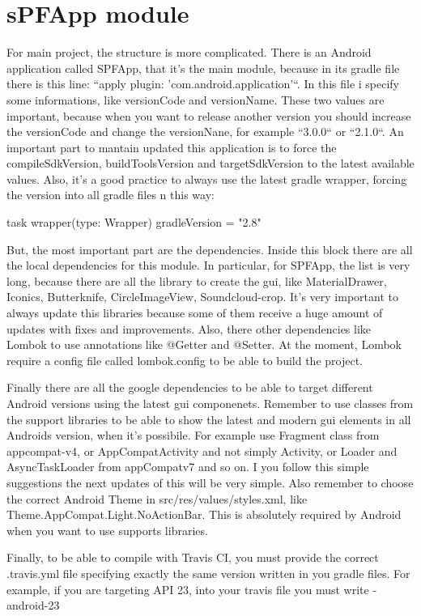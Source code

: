 \section*{sPFApp module}

For main project, the structure is more complicated.
There is an Android application called SPFApp, that it's the main module, because in its gradle file there is this line: ``apply plugin: 'com.android.application'``.
In this file i specify some informations, like versionCode and versionName. These two values are important, because when you want to release another version you should increase the versionCode and change the versionNane, for example ``3.0.0`` or ``2.1.0``.
An important part to mantain updated this application is to force the compileSdkVersion, buildToolsVersion and targetSdkVersion to the latest available values. Also, it's a good practice to always use the latest gradle wrapper, forcing the version into all gradle files n this way:

task wrapper(type: Wrapper) {
    gradleVersion = "2.8"
}

But, the most important part are the dependencies.
Inside this block there are all the local dependencies for this module. In particular, for SPFApp, the list is very long, because there are all the library to create the gui, like MaterialDrawer, Iconics, Butterknife, CircleImageView, Soundcloud-crop.
It's very important to always update this libraries because some of them receive a huge amount of updates with fixes and improvements.
Also, there other dependencies like Lombok to use annotations like @Getter and @Setter.
At the moment, Lombok require a config file called lombok.config to be able to build the project.

Finally there are all the google dependencies to be able to target different Android versions using the latest gui componenets. Remember to use classes from the support libraries to be able to show the latest and modern gui  elements in all Androids version, when it's possibile. For example use Fragment class from appcompat-v4, or AppCompatActivity and not simply Activity, or Loader and AsyncTaskLoader from appCompatv7 and so on. I you follow this simple suggestions the next updates of this  will be very simple.
Also remember to choose the correct Android Theme in src/res/values/styles.xml, like Theme.AppCompat.Light.NoActionBar. This is absolutely required by Android when you want to use supports libraries.

Finally, to be able to compile with Travis CI, you must provide the correct .travis.yml file specifying exactly the same version written in you gradle files.
For example, if you are targeting API 23, into your travis file you must write 
- android-23

